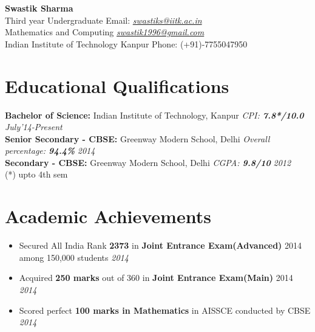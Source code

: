 \documentclass[11pt,a4paper]{article}
\begin{document}
\textbf{\huge{Swastik Sharma}}\\ 
Third year Undergraduate    \hfill Email: \href{mailto:swastiks@iitk.ac.in}{\textit{swastiks@iitk.ac.in}}\\
Mathematics and Computing    \hfill  \href{mailto:swastik1996@gmail.com}{\textit{swastik1996@gmail.com}}\\
Indian Institute of Technology Kanpur \hfill Phone: (+91)-7755047950
\vspace{-0.4cm}

\section*{Educational Qualifications}
\vspace{-0.1cm}

\textbf{\large{Bachelor of Science:}} Indian Institute of Technology, Kanpur \emph	{CPI: \textbf{7.8*/10.0} } \hfill\textit{July'14-Present}\vspace{0.1cm}\\
\textbf{\large{Senior Secondary - CBSE:}} Greenway Modern School, Delhi \emph{Overall percentage: \textbf{94.4\%}} \hfill\textit{2014}\vspace{0.1cm}\\
\textbf{\large{Secondary - CBSE:}} Greenway Modern School, Delhi \emph{CGPA: \textbf{9.8/10}} \hfill\textit{2012}
\vspace{0.1cm}\\
(*) upto 4th sem
\vspace{-0.4cm}
\section*{Academic Achievements}
\vspace{-0.2cm}
\begin{itemize}

\item Secured All India Rank \textbf{2373} in \textbf{Joint Entrance Exam(Advanced)} 2014 among 150,000 students          	\hfill \textit{2014}\vspace{0.1cm}
\item Acquired \textbf{250 marks} out of 360 in \textbf{Joint Entrance Exam(Main)} 2014      	\hfill \textit{2014}\vspace{0.1cm}
\item Scored perfect \textbf{100 marks in Mathematics} in AISSCE conducted by CBSE \hfill \textit{2014}\vspace{0.1cm}


\end{itemize}
\vspace{-0.4cm}
\end{document}
